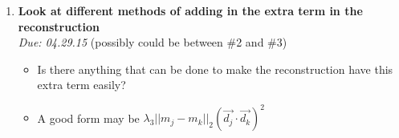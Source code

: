 \documentclass[11 pt]{article}
\newcommand{\bo}{\noindent\textbf}
\begin{document}
\begin{enumerate}
      
      \item \bo{Look at different methods of adding in the extra term in the reconstruction}\\
	    \emph{Due: 04.29.15} (possibly could be between \#2 and \#3)
	    \begin{itemize}
		  \item Is there anything that can be done to make the reconstruction have this extra term easily?
		  \item A good form may be $\lambda_3 ||m_j - m_k||_2 (\vec{d_j} \cdot \vec{d_k})^2$
	    \end{itemize}

\end{enumerate}
\end{document}
